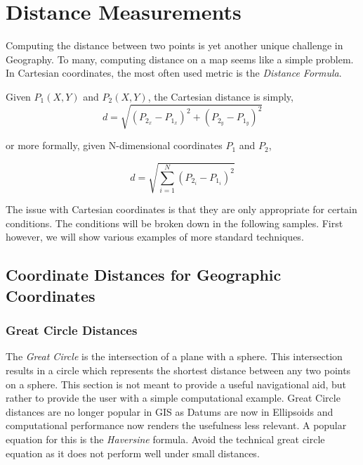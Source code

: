 %



\section*{Distance Measurements}

Computing the distance between two points is yet another unique challenge in 
Geography.  To many, computing distance on a map seems like a simple problem. 
In Cartesian coordinates, the most often used metric is the \emph{Distance Formula}.

Given $P_1 (X,Y)$ and $P_2 (X,Y)$, the Cartesian distance is simply,
\begin{equation}
d = \sqrt{ \left(P_{2_x} - P_{1_x} \right)^2 + \left(P_{2_y} - P_{1_y} \right)^2}
\end{equation}

or more formally, given N-dimensional coordinates $P_1$ and $P_2$,

\begin{equation}
d = \sqrt{ \sum^{N}_{i=1} (P_{2_i} - P_{1_i} )^2}
\end{equation}


The issue with Cartesian coordinates is that they are only appropriate for certain
conditions.  The conditions will be broken down in the following samples.  First however, 
we will show various examples of more standard techniques.


\subsection*{Coordinate Distances for Geographic Coordinates}


\subsubsection*{Great Circle Distances}

The \emph{Great Circle} is the intersection of a plane with a sphere.  This intersection
results in a circle which represents the shortest distance between any two points on
a sphere\cite[p. 108]{Meyer_Book}.  This section is not meant to provide a useful navigational aid, but rather to 
provide the user with a simple computational example.  Great Circle distances are no longer popular in GIS
as Datums are now in Ellipsoids and computational performance now renders the usefulness less relevant. A 
popular equation for this is the \emph{Haversine} formula.  Avoid the technical great circle equation as
it does not perform well under small distances.

